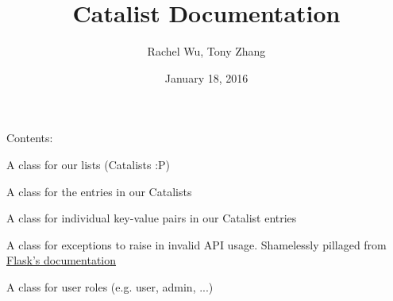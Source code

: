\documentclass[letterpaper,10pt,english]{sphinxmanual}
\title{Catalist Documentation}
\date{January 18, 2016}
\author{Rachel Wu, Tony Zhang}
\begin{document}
\maketitle
\tableofcontents
{}\label{index::doc}


Contents:
\label{index:module-routes}

\begin{fulllineitems}
\label{index:routes.Catalist}
A class for our lists (Catalists :P)

\end{fulllineitems}


\begin{fulllineitems}
\label{index:routes.CatalistEntry}
A class for the entries in our Catalists

\end{fulllineitems}


\begin{fulllineitems}
\label{index:routes.CatalistKVP}
A class for individual key-value pairs in our Catalist entries

\end{fulllineitems}


\begin{fulllineitems}
\label{index:routes.InvalidAPIUsage}
A class for exceptions to raise in invalid API usage.
Shamelessly pillaged from \href{http://flask.pocoo.org/docs/0.10/patterns/apierrors/}{Flask's documentation}

\end{fulllineitems}


\begin{fulllineitems}
\label{index:routes.Role}
A class for user roles (e.g. user, admin, ...)

\end{fulllineitems}
\end{document}
